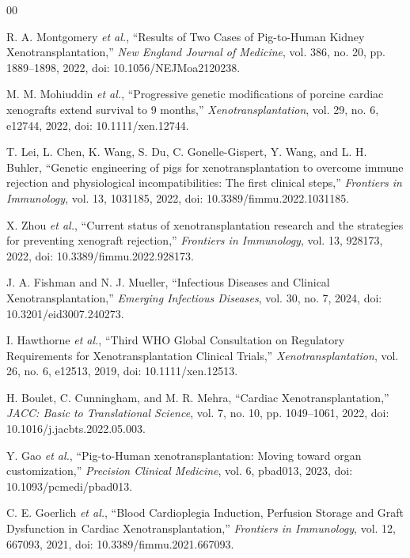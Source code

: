 \documentclass[conference]{IEEEtran}
\begin{document}
\begin{thebibliography}{00}

 R. A. Montgomery \emph{et al.}, ``Results of Two Cases of Pig-to-Human Kidney Xenotransplantation,'' \emph{New England Journal of Medicine}, vol. 386, no. 20, pp. 1889--1898, 2022, doi: 10.1056/NEJMoa2120238.

 M. M. Mohiuddin \emph{et al.}, ``Progressive genetic modifications of porcine cardiac xenografts extend survival to 9 months,'' \emph{Xenotransplantation}, vol. 29, no. 6, e12744, 2022, doi: 10.1111/xen.12744.

 T. Lei, L. Chen, K. Wang, S. Du, C. Gonelle-Gispert, Y. Wang, and L. H. Buhler, ``Genetic engineering of pigs for xenotransplantation to overcome immune rejection and physiological incompatibilities: The first clinical steps,'' \emph{Frontiers in Immunology}, vol. 13, 1031185, 2022, doi: 10.3389/fimmu.2022.1031185.

 X. Zhou \emph{et al.}, ``Current status of xenotransplantation research and the strategies for preventing xenograft rejection,'' \emph{Frontiers in Immunology}, vol. 13, 928173, 2022, doi: 10.3389/fimmu.2022.928173.

 J. A. Fishman and N. J. Mueller, ``Infectious Diseases and Clinical Xenotransplantation,'' \emph{Emerging Infectious Diseases}, vol. 30, no. 7, 2024, doi: 10.3201/eid3007.240273.

 I. Hawthorne \emph{et al.}, ``Third WHO Global Consultation on Regulatory Requirements for Xenotransplantation Clinical Trials,'' \emph{Xenotransplantation}, vol. 26, no. 6, e12513, 2019, doi: 10.1111/xen.12513.

 H. Boulet, C. Cunningham, and M. R. Mehra, ``Cardiac Xenotransplantation,'' \emph{JACC: Basic to Translational Science}, vol. 7, no. 10, pp. 1049--1061, 2022, doi: 10.1016/j.jacbts.2022.05.003.

 Y. Gao \emph{et al.}, ``Pig-to-Human xenotransplantation: Moving toward organ customization,'' \emph{Precision Clinical Medicine}, vol. 6, pbad013, 2023, doi: 10.1093/pcmedi/pbad013.

 C. E. Goerlich \emph{et al.}, ``Blood Cardioplegia Induction, Perfusion Storage and Graft Dysfunction in Cardiac Xenotransplantation,'' \emph{Frontiers in Immunology}, vol. 12, 667093, 2021, doi: 10.3389/fimmu.2021.667093.


\end{thebibliography}
\end{document}
